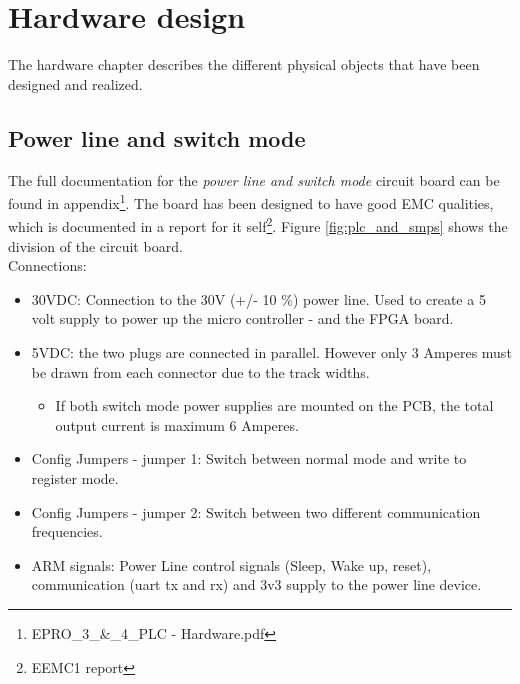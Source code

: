 \chapter{Hardware design}
The hardware chapter describes the different physical objects that have been designed and realized. 
\section{Power line and switch mode}
%
The full documentation for the \textit{power line and switch mode} circuit board can be found in appendix\footnote{EPRO\_3\_\&\_4\_PLC - Hardware.pdf}. The board has been designed to have good EMC qualities, which is documented in a report for it self\footnote{EEMC1 report}.
\p Figure \ref{fig:plc_and_smps} shows the division of the circuit board.
\\ Connections:
\begin{itemize}
	\item 30VDC: Connection to the 30V (+/- 10 \%) power line. Used to create a 5 volt supply to power up the micro controller - and the FPGA board.
	\item 5VDC: the two plugs are connected in parallel. However only 3 Amperes must be drawn from each connector due to the track widths.
	\begin{itemize}
		\item If both switch mode power supplies are mounted on the PCB, the total output current is maximum 6 Amperes.
	\end{itemize}
	\item Config Jumpers - jumper 1: Switch between normal mode and write to register mode.
	\item Config Jumpers - jumper 2: Switch between two different communication frequencies.
	\item ARM signals: Power Line control signals (Sleep, Wake up, reset), communication (uart tx and rx) and 3v3 supply to the power line device.
\end{itemize}

